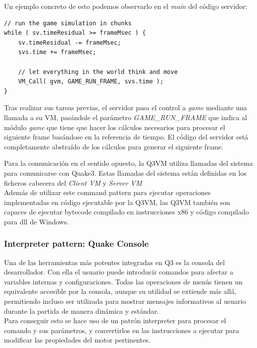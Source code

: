 \documentclass[a4paper,12pt]{report}
\begin{document}
	Un ejemplo concreto de esto podemos observarlo en el \textit{main} del código servidor:
	
		\begin{lstlisting}[style=C, numbers=none]
// run the game simulation in chunks
while ( sv.timeResidual >= frameMsec ) {
	sv.timeResidual -= frameMsec;
	svs.time += frameMsec;
	
	// let everything in the world think and move
	VM_Call( gvm, GAME_RUN_FRAME, svs.time );
}
	\end{lstlisting}
	
	Tras realizar sus tareas previas, el servidor pasa el control a \textit{game} mediante una llamada a su VM, pasándole el parámetro \textit{GAME\_RUN\_FRAME} que indica al módulo \textit{game} que tiene que hacer los cálculos necesarios para procesar el siguiente frame basándose en la referencia de tiempo. El código del servidor está completamente abstraído de los cálculos para generar el siguiente frame.\\
	 \cite{q3vmcallex}

	Para la comunicación en el sentido opuesto, la Q3VM utiliza llamadas del sistema para comunicarse con Quake3. Estas llamadas del sistema están definidas en los ficheros cabecera del \textit{Client VM}\cite{q3vmclient} y \textit{Server VM}\cite{q3vmserver}\\
	
	
	Además de utilizar este command pattern para ejecutar operaciones implementadas en código ejecutable por la Q3VM, las Q3VM también son capaces de ejecutar bytecode compilado en instrucciones x86 y código compilado para dll de Windows. \cite{q3vmbb}
	
	
		\subsubsection{Interpreter pattern: Quake Console}
	Una de las herramientas más potentes integradas en Q3 es la consola del desarrollador. Con ella el usuario puede introducir comandos para afectar a variables internas y configuraciones. Todas las operaciones de menús tienen un equivalente accesible por la consola, aunque su utilidad se extiende más allá, permitiendo incluso ser utilizada para mostrar mensajes informativos al usuario durante la partida de manera dinámica y estándar.\\
	
	Para conseguir esto se hace uso de un patrón interpreter para procesar el comando y sus parámetros, y convertirlos en las instrucciones a ejecutar para modificar las propiedades del motor pertinentes.\cite{console_source}\cite{consolecmd_source}\\
	
\end{document}
